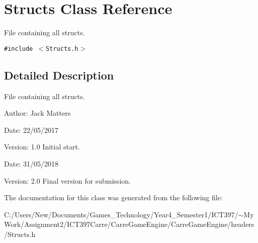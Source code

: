 \hypertarget{class_structs}{
\section{Structs Class Reference}
\label{class_structs}
}
File containing all structs.  


{\tt \#include $<$Structs.h$>$}



\subsection{Detailed Description}
File containing all structs. 

\begin{Desc}
\item[Author:]Jack Matters\end{Desc}
\begin{Desc}
\item[Date:]22/05/2017 \end{Desc}
\begin{Desc}
\item[Version:]1.0 Initial start.\end{Desc}
\begin{Desc}
\item[Date:]31/05/2018 \end{Desc}
\begin{Desc}
\item[Version:]2.0 Final version for submission. \end{Desc}


The documentation for this class was generated from the following file:\begin{CompactItemize}
\item 
C:/Users/New/Documents/Games\_\-Technology/Year4\_\-Semester1/ICT397/$\sim$My Work/Assignment2/ICT397Carre/CarreGameEngine/CarreGameEngine/headers/Structs.h\end{CompactItemize}
